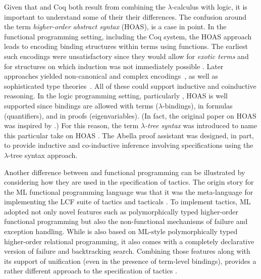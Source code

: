 Given that \lP and Coq both result from combining the
$\lambda$-calculus with logic, it is important to understand some of
their their differences.  The confusion around the term
\emph{higher-order abstract syntax} (HOAS), is a case in point.  In
the functional programming setting, including the Coq system, the HOAS
approach leads to encoding binding structures within terms using
functions.  The earliest such encodings were unsatisfactory since they
would allow for \emph{exotic terms} \cite{despeyroux95tlca} and for
structures on which induction was not immediately possible \cite{roeckl01fossacs}.
Later approaches yielded non-canonical and complex encodings~\cite{chlipala08icfp,honsell01tcs}, as well as sophisticated type theories~\cite{pientka10ijcar}. All of
these could support inductive and coinductive reasoning. 
In the logic programming setting, particularly \lP, HOAS is well
supported since bindings are allowed with terms ($\lambda$-bindings),
in formulas (quantifiers), and in proofs (eigenvariables).  (In fact,
the original paper on HOAS \cite{pfenning88pldi} was inspired by \lP.)
For this reason, the term \emph{$\lambda$-tree syntax} was introduced
to name this particular take on HOAS \cite{miller19jar}.  The Abella
proof assistant \cite{baelde14jfr} was designed, in part, to provide
inductive and co-inductive inference involving specifications using
the $\lambda$-tree syntax approach.

Another difference between \lP and functional programming can be
illustrated by considering how they are used in the specification of
tactics.  The origin story for the ML functional programming language
was that it was the meta-language for implementing the LCF suite of
tactics and tacticals \cite{gordon79}.  To implement tactics, ML
adopted not only novel features such as polymorphically typed
higher-order functional programming but also the non-functional
mechanisms of failure and exception handling.  While \lP is also based
on ML-style polymorphically typed higher-order relational
programming,
it also comes with a
completely declarative version of failure and backtracking search.
Combining those features along with its support of unification (even
in the presence of term-level bindings), \lP provides a rather
different approach to the specification of tactics \cite{felty93jar}.

